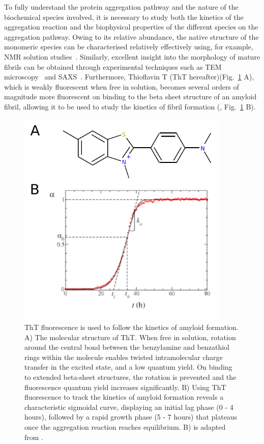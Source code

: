 To fully understand the protein aggregation pathway and the nature of the biochemical species involved, it is necessary to study both the kinetics of the aggregation reaction and the biophysical properties of the different species on the aggregation pathway. Owing to its relative abundance, the native structure of the monomeric species can be characterised relatively effectively using, for example, NMR solution studies~\cite{Dedmon2005}. Similarly, excellent insight into the morphology of mature fibrils can be obtained through experimental techniques such as TEM microscopy~\cite{Gras2011} and SAXS~\cite{Langkilde2009}. Furthermore, Thioflavin T (ThT hereafter)(Fig.~\ref{fig:ThT} A), which is weakly fluorescent when free in solution, becomes several orders of magnitude more fluorescent on binding to the beta sheet structure of an amyloid fibril, allowing it to be used to study the kinetics of fibril formation (\cite{Cohen2012}, Fig.~\ref{fig:ThT} B).

\begin{figure}
   \begin{center}
      \includegraphics*[clip=true, width=4in]{sizing/tht_fig.pdf}
      \caption{ThT fluorescence is used to follow the kinetics of amyloid formation. A) The molecular structure of ThT. When free in solution, rotation around the central bond between the benzylamine and benzathiol rings within the molecule enables twisted intramolecular charge transfer in the excited state, and a low quantum yield. On binding to extended beta-sheet structures, the rotation is prevented and the fluorescence quantum yield increases significantly. B) Using ThT fluorescence to track the kinetics of amyloid formation reveals a characteristic sigmoidal curve, displaying an initial lag phase (0 - 4 hours), followed by a rapid growth phase (5 - 7 hours) that plateaus once the aggregation reaction reaches equilibrium. B) is adapted from \cite{auer2010}.}
      \label{fig:ThT}
   \end{center}
\end{figure}

